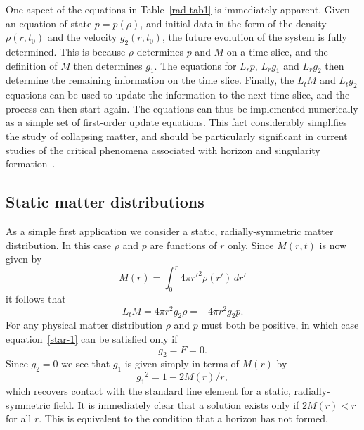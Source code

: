 \documentclass[a4paper]{article}
\numberwithin{equation}{section}
\begin{document}
One aspect of the equations in Table~\ref{rad-tab1} is immediately
apparent.  Given an equation of state $p=p(\rho)$, and initial data in
the form of the density $\rho(r,t_0)$ and the velocity $g_2(r,t_0)$,
the future evolution of the system is fully determined.  This is
because $\rho$ determines $p$ and $M$ on a time slice, and the
definition of $M$ then determines $g_1$.  The equations for $L_r p$,
$L_r g_1$ and $L_r g_2$ then determine the remaining information on
the time slice.  Finally, the $L_t M$ and $L_t g_2$ equations can be
used to update the information to the next time slice, and the process
can then start again.  The equations can thus be implemented
numerically as a simple set of first-order update equations.  This
fact considerably simplifies the study of collapsing matter, and
should be particularly significant in current studies of the
critical phenomena associated with horizon and singularity
formation~\cite{cho93,abr93}.



\subsection{Static matter distributions}
\label{SS-STAT}

As a simple first application we consider a static, radially-symmetric
matter distribution.  In this case $\rho$ and $p$ are functions of
$r$ only.  Since $M(r,t)$ is now given by
%
\begin{equation}
M(r) = \int_0^r 4 \pi {r'}^2 \rho(r') \, dr'
\label{SS-M4stat}
\end{equation}
%
it follows that 
%
\begin{equation}
L_t M = 4 \pi r^2 g_2 \rho = - 4 \pi r^2 g_2 p.
\label{star-1}
\end{equation}
%
For any physical matter distribution $\rho$ and $p$ must both be
positive, in which case equation~\eqref{star-1} can be satisfied only if
%
\begin{equation}
g_2 = F = 0 .
\end{equation}
%
Since $g_2=0$ we see that $g_1$ is given simply in terms of $M(r)$ by
%
\begin{equation}
{g_1}^2 = 1- 2M(r)/r,
\label{star-4}
\end{equation}
%
which recovers contact with the standard line element for a static,
radially-symmetric field.  It is immediately clear that a solution
exists only if $2M(r)<r$ for all $r$.  This is equivalent to the
condition that a horizon has not formed.
\end{document}
